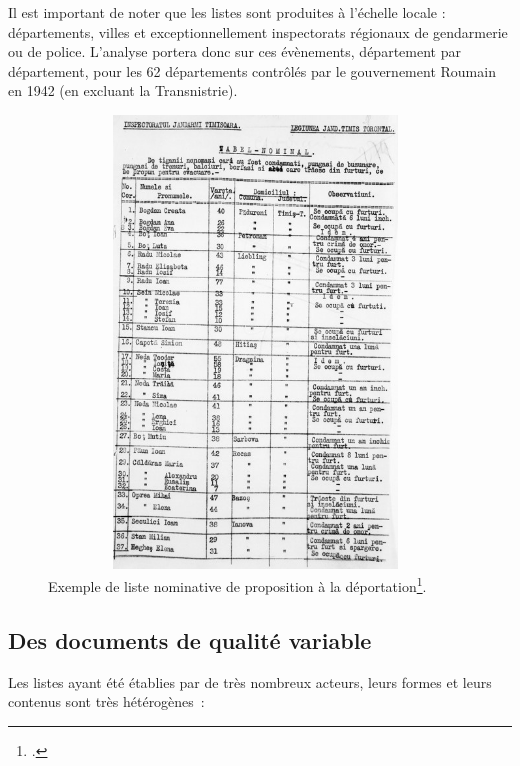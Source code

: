 \documentclass[a4paper,12pt,twoside]{book}
\begin{document}
			    Il est important de noter que les listes sont produites à l’échelle locale : départements, villes et exceptionnellement inspectorats régionaux de gendarmerie ou de police. L'analyse portera donc sur ces évènements, département par département, pour les 62 départements contrôlés par le gouvernement Roumain en 1942 (en excluant la Transnistrie).

                \pagebreak
                
                \begin{figure}[!ht]
        			\centering
                    \includegraphics[width=11cm,height=12cm]{images/rg_25_050m_0010_00000344.jpg}
                    \caption{Exemple de liste nominative de proposition à la déportation\footcite[Liste de l'inspection de la gendarmerie de Timișoara~:][Copyright \textit{Arhivele Naţionale ale României}]{rg-25.050mfileid:45931SelectedRecordsVarious}.}
                    \label{fig5}
                \end{figure}
                \vspace{-2em}

			 \subsection{Des documents de qualité variable}
			    
			    Les listes ayant été établies par de très nombreux acteurs, leurs formes et leurs contenus sont très hétérogènes~:
			    
\end{document}
